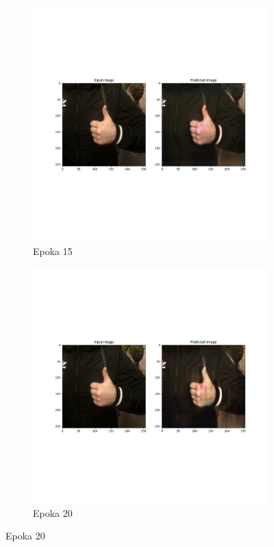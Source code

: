 \documentclass[12pt]{article}
\begin{document}
\begin{sloppypar}
{{    \begin{figure}
      \begin{subfigure}{.5\textwidth}
        \centering
        \includegraphics[width=.8\linewidth]{cycle-gan/epoch-15.jpg}
        \caption{Epoka 15}
        \label{fig:cg-15}
      \end{subfigure}%
      \begin{subfigure}{.5\textwidth}
        \centering
        \includegraphics[width=.8\linewidth]{cycle-gan/epoch-20.jpg}
        \caption{Epoka 20}
        \label{fig:cg-20}
      \end{subfigure}

\end{figure}}}
\end{sloppypar}
\end{document}
